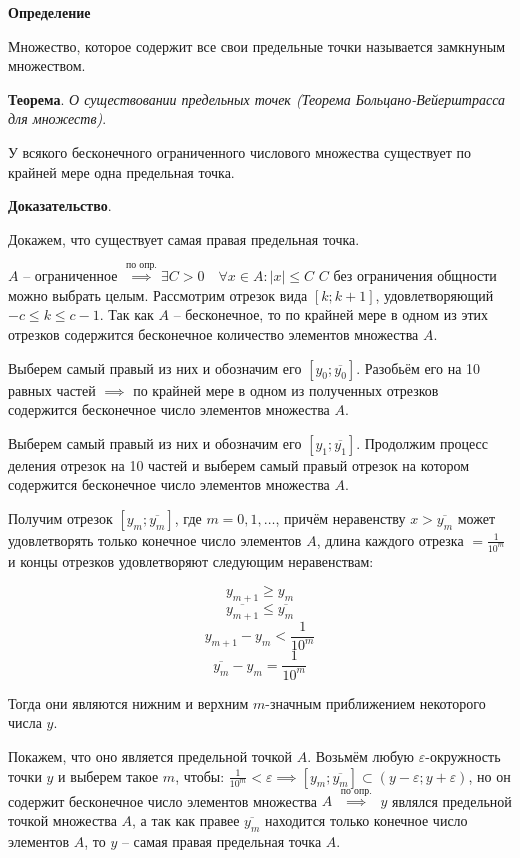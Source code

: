 \documentclass{article}
\newcommand{\bydef}{\stackrel{\text{по опр.}}{\implies}} %
\newcommand{\parspace}{\vspace{10pt}}
\begin{document}
\textbf{Определение}

Множество, которое содержит все свои предельные точки называется замкнуным множеством.

\parspace

\textbf{Теорема}. \textit{О существовании предельных точек (Теорема Больцано-Вейерштрасса для множеств)}.

У всякого бесконечного ограниченного числового множества существует по крайней мере
одна предельная точка.

\textbf{Доказательство}.

Докажем, что существует самая правая предельная точка.

$A$ -- ограниченное $\bydef \exists C > 0 \quad
\forall x \in A: |x| \le C$
$C$ без ограничения общности можно выбрать целым.
Рассмотрим отрезок вида $[k;k+1]$, удовлетворяющий $-c \le k \le c - 1$.
Так как $A$ -- бесконечное, то по крайней мере в одном из этих отрезков содержится
бесконечное количество элементов множества $A$.

Выберем самый правый из них и обозначим его $[y_0;\overline{y_0}]$.
Разобьём его на 10 равных частей $\implies$ по крайней мере в одном из
полученных отрезков содержится бесконечное число элементов множества $A$.

Выберем самый правый из них и обозначим его $[y_1;\overline{y_1}]$.
Продолжим процесс деления отрезок на 10 частей и выберем самый правый отрезок
на котором содержится бесконечное число элементов множества $A$.

Получим отрезок $[y_m;\overline{y_m}]$, где $m = 0,1,\dots$, причём неравенству
$x > \overline{y_m}$ может удовлетворять только конечное число элементов $A$,
длина каждого отрезка $= \frac{1}{10^m}$ и концы отрезков удовлетворяют
следующим неравенствам:

\[y_{m+1} \ge y_m\]
\[\overline{y_{m+1}} \le \overline{y_m}\]
\[y_{m+1} - y_m < \frac{1}{10^m}\]
\[\overline{y_m} - y_m = \frac{1}{10^m}\]

Тогда они являются нижним и верхним $m$-значным приближением некоторого числа $y$.

Покажем, что оно является предельной точкой $A$. Возьмём любую $\varepsilon$-окружность
точки $y$ и выберем такое $m$, чтобы: 
$\frac{1}{10^m} < \varepsilon \implies [y_m;\overline{y_m}] \subset 
(y - \varepsilon; y + \varepsilon)$, но он содержит бесконечное число элементов
множества $A$ $\bydef$ $y$ являлся предельной точкой
множества $A$, а так как правее $\overline{y_m}$ находится только конечное число
элементов $A$, то $y$ -- самая правая предельная точка $A$.
\end{document}

